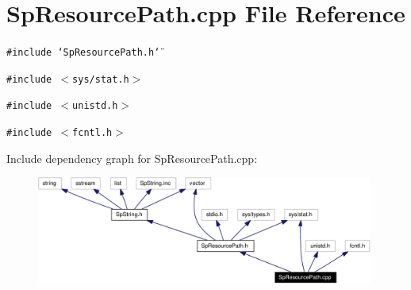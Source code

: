 \section{Sp\-Resource\-Path.cpp File Reference}
\label{SpResourcePath_8cpp}
{\tt \#include \char`\"{}Sp\-Resource\-Path.h\char`\"{}}\par
{\tt \#include $<$sys/stat.h$>$}\par
{\tt \#include $<$unistd.h$>$}\par
{\tt \#include $<$fcntl.h$>$}\par


Include dependency graph for Sp\-Resource\-Path.cpp:\begin{figure}[H]
\begin{center}
\leavevmode
\includegraphics[width=314pt]{SpResourcePath_8cpp__incl}
\end{center}
\end{figure}
